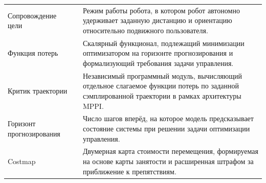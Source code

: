 
\noindent
\begin{tabular}{@{}p{}@{}p{}@{}p{}@{}}
Сопровождение цели    && Режим работы робота, в котором робот автономно удерживает заданную дистанцию и ориентацию относительно подвижного пользователя. \\
Функция потерь        && Скалярный функционал, подлежащий минимизации оптимизатором на горизонте прогнозирования и формализующий требования задачи управления. \\
Критик траектории     && Независимый программный модуль, вычисляющий отдельное слагаемое функции потерь по заданной сэмплированной траектории в рамках архитектуры MPPI. \\
Горизонт прогнозирования && Число шагов вперёд, на которое модель предсказывает состояние системы при решении задачи оптимизации управления. \\
Costmap               && Двумерная карта стоимости перемещения, формируемая на основе карты занятости и расширенная штрафом за приближение к препятствиям. \\
\end{tabular}
